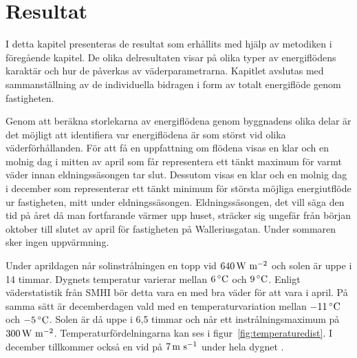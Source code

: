 \chapter{Resultat}

I detta kapitel presenteras de resultat som erhållits med hjälp av metodiken i föregående kapitel. De olika delresultaten visar på olika typer av energiflödens karaktär och hur de påverkas av väderparametrarna. Kapitlet avslutas med sammanställning av de individuella bidragen i form av totalt energiflöde genom fastigheten.

Genom att beräkna storlekarna av energiflödena genom byggnadens olika delar är det möjligt att identifiera var energiflödena är som störst vid olika väderförhållanden. För att få en uppfattning om flödena visas en klar och en molnig dag i mitten av april som får representera ett tänkt maximum för varmt väder innan eldningssäsongen tar slut. Dessutom visas en klar och en molnig dag i december som representerar ett tänkt minimum för största möjliga energiutflöde ur fastigheten, mitt under eldningssäsongen. Eldningssäsongen, det vill säga den tid på året då man fortfarande värmer upp huset, sträcker sig ungefär från början oktober till slutet av april för fastigheten på Walleriusgatan. Under sommaren sker ingen uppvärmning.

Under aprildagen når solinstrålningen en topp vid $\unit[640]{W~m^{-2}}$ och solen är uppe i 14 timmar. Dygnets temperatur varierar mellan $\unit[6]{^\circ C}$ och $\unit[9]{^\circ C}$. Enligt väderstatistik från SMHI\cite{SMHIdata} bör detta vara en med bra väder för att vara i april. På samma sätt är decemberdagen vald med en temperaturvariation mellan $\unit[-11]{^\circ C}$  och $\unit[-5]{^\circ C}$. Solen är då uppe i 6,5 timmar och når ett instrålningsmaximum på $\unit[300]{W~m^{-2}}$. Temperatur\-fördelningarna kan ses i figur~\ref{fig:temperaturedist}. I december tillkommer också en vid på $\unit[7]{m~s^{-1}}$ under hela dygnet .










